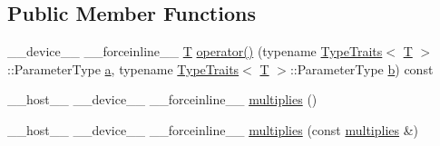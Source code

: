 \subsection*{Public Member Functions}
\begin{DoxyCompactItemize}
\item 
\-\_\-\-\_\-device\-\_\-\-\_\- \-\_\-\-\_\-forceinline\-\_\-\-\_\- \hyperlink{calib3d_8hpp_a3efb9551a871ddd0463079a808916717}{T} \hyperlink{structcv_1_1gpu_1_1device_1_1multiplies_aa0b30ea23f710e47daf20bfc18a5d662}{operator()} (typename \hyperlink{structcv_1_1gpu_1_1device_1_1TypeTraits}{Type\-Traits}$<$ \hyperlink{calib3d_8hpp_a3efb9551a871ddd0463079a808916717}{T} $>$\-::Parameter\-Type \hyperlink{legacy_8hpp_a1031d0e0a97a340abfe0a6ab9e831045}{a}, typename \hyperlink{structcv_1_1gpu_1_1device_1_1TypeTraits}{Type\-Traits}$<$ \hyperlink{calib3d_8hpp_a3efb9551a871ddd0463079a808916717}{T} $>$\-::Parameter\-Type \hyperlink{legacy_8hpp_ac04272e8ca865b8fba18d36edae9fd2a}{b}) const 
\item 
\-\_\-\-\_\-host\-\_\-\-\_\- \-\_\-\-\_\-device\-\_\-\-\_\- \-\_\-\-\_\-forceinline\-\_\-\-\_\- \hyperlink{structcv_1_1gpu_1_1device_1_1multiplies_ab61d59c00bdf3e5a242729a2a7539a88}{multiplies} ()
\item 
\-\_\-\-\_\-host\-\_\-\-\_\- \-\_\-\-\_\-device\-\_\-\-\_\- \-\_\-\-\_\-forceinline\-\_\-\-\_\- \hyperlink{structcv_1_1gpu_1_1device_1_1multiplies_ad8c93f67ed26a18a3c368c4959dc8d6e}{multiplies} (const \hyperlink{structcv_1_1gpu_1_1device_1_1multiplies}{multiplies} \&)
\end{DoxyCompactItemize}


